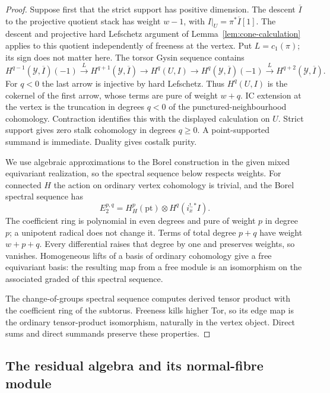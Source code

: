 \documentclass[11pt]{amsart}
\theoremstyle{definition}
\theoremstyle{remark}
\begin{document}
\begin{proof}
Suppose first that the strict support has positive dimension.  The
descent $\overline I$ to the projective quotient stack has weight $w-1$,
with $I|_U=\pi^*\overline I[1]$.  The descent and projective hard
Lefschetz argument of Lemma~\ref{lem:cone-calculation} applies to this
quotient independently of freeness at the vertex.  Put $L=c_1(\pi)$;
its sign does not matter here.  The torsor Gysin sequence contains
\[
 H^{q-1}(\mathcal Y,\overline I)(-1)
 \xrightarrow{L}H^{q+1}(\mathcal Y,\overline I)
 \longrightarrow H^q(U,I)
 \longrightarrow H^q(\mathcal Y,\overline I)(-1)
 \xrightarrow{L}H^{q+2}(\mathcal Y,\overline I).
\]
For $q<0$ the last arrow is injective by hard Lefschetz.  Thus $H^q(U,I)$
is the cokernel of the first arrow, whose terms are pure of weight
$w+q$.  IC extension at the vertex is the truncation in degrees $q<0$
of the punctured-neighbourhood cohomology.  Contraction identifies this
with the displayed calculation on $U$.  Strict support gives zero
stalk cohomology in degrees $q\geq0$.  A point-supported summand is
immediate.  Duality gives costalk purity.

We use algebraic approximations to the Borel construction in the given
mixed equivariant realization, so the spectral sequence below respects
weights.  For connected $H$ the action on ordinary vertex cohomology is trivial,
and the Borel spectral sequence has
\[
 E_2^{p,q}=H_H^p(\mathrm{pt})\otimes H^q(i_x^{!,*}I).
\]
The coefficient ring is polynomial in even degrees and pure of weight
$p$ in degree $p$; a unipotent radical does not change it.
Terms of total degree $p+q$ have weight $w+p+q$.  Every differential
raises that degree by one and preserves weights, so vanishes.
Homogeneous lifts of a basis of ordinary cohomology give a free
equivariant basis: the resulting map from a free module is an
isomorphism on the associated graded of this spectral sequence.

The change-of-groups spectral sequence computes derived tensor product
with the coefficient ring of the subtorus.  Freeness kills higher Tor,
so its edge map is the ordinary tensor-product isomorphism, naturally
in the vertex object.  Direct sums and direct summands preserve these
properties.
\end{proof}

\subsection{The residual algebra and its normal-fibre module}
\end{document}
